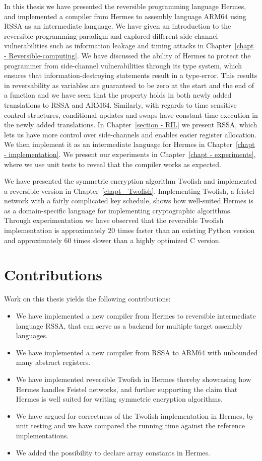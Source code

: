 In this thesis we have presented the reversible programming language Hermes, and implemented a compiler from Hermes to assembly language ARM64 using RSSA as an intermediate language.
We have given an introduction to the reversible programming paradigm and explored different side-channel vulnerabilities such as information leakage and timing attacks in Chapter~\ref{chapt - Reversible-computing}.
We have discussed the ability of Hermes to protect the programmer from side-channel vulnerabilities through its type system, which ensures that information-destroying statements result in a type-error.
This results in reversability as variables are guaranteed to be zero at the start and the end of a function and we have seen that the property holds in both newly added translations to RSSA and ARM64.
Similarly, with regards to time sensitive control structures, conditional updates and swaps have constant-time execution in the newly added translations. 
In Chapter~\ref{section - RIL} we present RSSA, which lets us have more control over side-channels and enables easier register allocation. We then implement it as an intermediate language for Hermes in Chapter~\ref{chapt - implementation}.
We present our experiments in Chapter~\ref{chapt - experiments}, where we use unit tests to reveal that the compiler works as expected.

We have presented the symmetric encryption algorithm Twofish and implemented a reversible version in Chapter~\ref{chapt - Twofish}.
Implementing Twofish, a feistel network with a fairly complicated key schedule, shows how well-suited Hermes is as a domain-specific language for implementing cryptographic algorithms.
Through experimentation we have observed that the reversible Twofish implementation is approximately $20$ times faster than an existing Python version and approximately $60$ times slower than a highly optimized C version.

\section{Contributions}
Work on this thesis yields the following contributions:
\begin{itemize}
  \item We have implemented a new compiler from Hermes to reversible intermediate language RSSA, that can serve as a backend for multiple target assembly languages.
  \item We have implemented a new compiler from RSSA to ARM64 with unbounded many abstract registers. 
  \item We have implemented reversible Twofish in Hermes thereby showcasing how Hermes handles Feistel networks, and further supporting the claim that Hermes is well suited for writing symmetric encryption algorithms.
  \item We have argued for correctness of the Twofish implementation in Hermes, by unit testing and we have compared the running time against the reference implementations.
  \item We added the possibility to declare array constants in Hermes.
\end{itemize}

